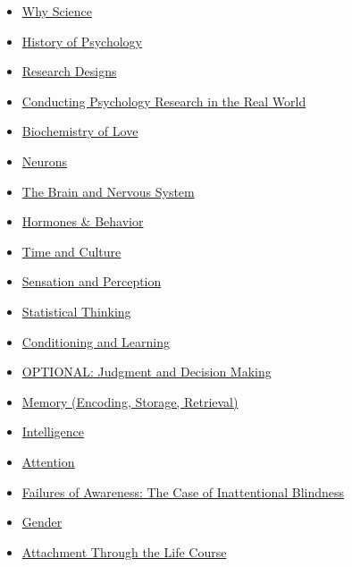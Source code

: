 \documentclass[
]{article}
\providecommand{\tightlist}{%
  \setlength{\itemsep}{0pt}\setlength{\parskip}{0pt}}
\begin{document}
\begin{itemize}
\tightlist
\item
  \href{http://nobaproject.com/modules/why-science}{Why Science}
\item
  \href{http://nobaproject.com/modules/history-of-psychology}{History of Psychology}
\item
  \href{http://nobaproject.com/modules/research-designs}{Research Designs}
\item
  \href{http://nobaproject.com/modules/conducting-psychology-research-in-the-real-world}{Conducting Psychology Research in the Real World}
\item
  \href{http://nobaproject.com/modules/biochemistry-of-love}{Biochemistry of Love}
\item
  \href{http://nobaproject.com/modules/neurons}{Neurons}
\item
  \href{http://nobaproject.com/modules/the-brain-and-nervous-system}{The Brain and Nervous System}
\item
  \href{http://nobaproject.com/modules/hormones-behavior}{Hormones \& Behavior}
\item
  \href{http://nobaproject.com/modules/time-and-culture}{Time and Culture}
\item
  \href{http://nobaproject.com/modules/sensation-and-perception}{Sensation and Perception}
\item
  \href{http://nobaproject.com/modules/statistical-thinking}{Statistical Thinking}
\item
  \href{http://nobaproject.com/modules/conditioning-and-learning}{Conditioning and Learning}
\item
  \href{http://nobaproject.com/modules/judgment-and-decision-making}{OPTIONAL: Judgment and Decision Making}
\item
  \href{http://nobaproject.com/modules/memory-encoding-storage-retrieval}{Memory (Encoding, Storage, Retrieval)}
\item
  \href{http://nobaproject.com/modules/intelligence}{Intelligence}
\item
  \href{http://nobaproject.com/modules/attention}{Attention}
\item
  \href{http://nobaproject.com/modules/failures-of-awareness-the-case-of-inattentional-blindness}{Failures of Awareness: The Case of Inattentional Blindness}
\item
  \href{http://nobaproject.com/modules/gender}{Gender}
\item
  \href{http://nobaproject.com/modules/attachment-through-the-life-course}{Attachment Through the Life Course}

\end{itemize}
\end{document}
